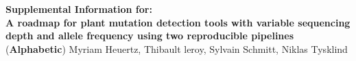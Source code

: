 \documentclass[12pt,]{article}
\begin{document}
\begin{center}
  \normalsize{\textbf{Supplemental Information for:}} \\
  \vspace{5mm}
  \large{\textbf{A roadmap for plant mutation detection tools with variable sequencing depth and allele frequency using two reproducible pipelines}} \\
  \vspace{5mm}
  \normalsize{(\textbf{Alphabetic}) Myriam Heuertz, Thibault leroy, Sylvain Schmitt, Niklas Tysklind} \\
  \tableofcontents
  \listoftables
  \listoffigures
\end{center}

\newpage




\end{document}
